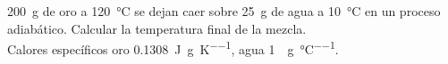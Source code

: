 \SI{200}{\gram} de oro a \SI{120}{\celsius} se dejan caer sobre \SI{25}{\gram} de agua a \SI{10}{\celsius} en un proceso adiabático. Calcular la temperatura final de la mezcla.\\  
Calores específicos oro \SI{0,1308}{\joule\per\gram\per\kelvin}, agua \SI{1}{\calorie\per\gram\per\celsius}.
